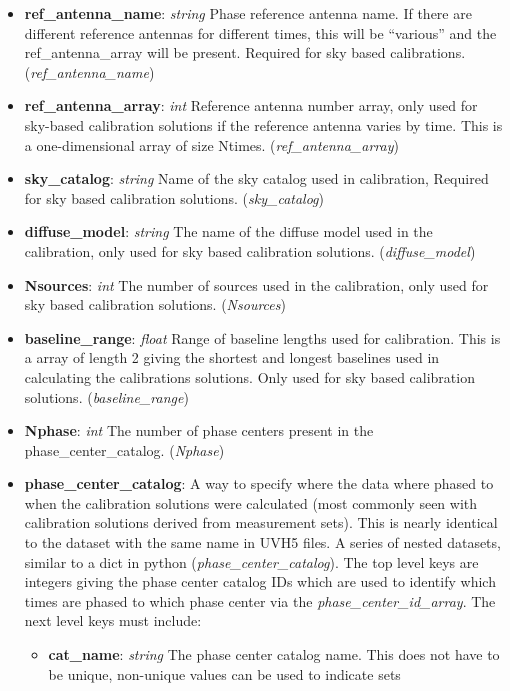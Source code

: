 \documentclass[11pt, oneside]{article}
\begin{document}
\begin{itemize}
\item \textbf{ref\_antenna\_name}: \textit{string}  Phase reference antenna name.
  If there are different reference antennas for different times, this will be ``various''
  and the ref\_antenna\_array will be present. Required for sky based calibrations. 
  (\textit{ref\_antenna\_name})
\item \textbf{ref\_antenna\_array}: \textit{int} Reference antenna number array,
  only used for sky-based calibration solutions if the reference antenna varies
  by time.  This is a one-dimensional array of size Ntimes. 
  (\textit{ref\_antenna\_array})
\item \textbf{sky\_catalog}: \textit{string}  Name of the sky catalog used in calibration,
  Required for sky based calibration solutions. (\textit{sky\_catalog})
\item \textbf{diffuse\_model}: \textit{string}  The name of the diffuse model used
  in the calibration, only used for sky based calibration solutions.
  (\textit{diffuse\_model})
\item \textbf{Nsources}: \textit{int} The number of sources used in the calibration,
  only used for sky based calibration solutions. (\textit{Nsources})
\item \textbf{baseline\_range}: \textit{float} Range of baseline lengths used for calibration.
  This is a array of length 2 giving the shortest and longest baselines used in calculating
  the calibrations solutions. Only used for sky based calibration solutions. 
  (\textit{baseline\_range})
\item \textbf{Nphase}: \textit{int} The number of phase centers present in the
  phase\_center\_catalog. (\textit{Nphase})
\item \textbf{phase\_center\_catalog}: A way to specify where the data where
phased to when the calibration solutions were calculated (most commonly
seen with calibration solutions derived from measurement sets). This is nearly
identical to the dataset with the same name in UVH5 files. A series of nested
datasets, similar to a dict in python (\textit{phase\_center\_catalog}).
The top level keys are integers giving the phase center catalog IDs which are
used to identify which times are phased to which phase center via the
\textit{phase\_center\_id\_array}.
The next level keys must include:
	\begin{itemize}
	\item \textbf{cat\_name}: \textit{string} The phase center catalog name. This
	  does not have to be unique, non-unique values can be used to indicate sets

\end{itemize}
\end{itemize}
\end{document}
